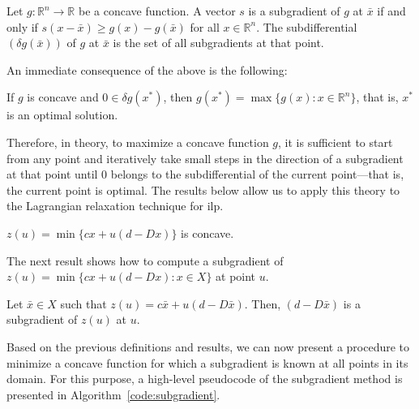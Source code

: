 \begin{definition}\label{definition:subgradient}
	Let $g : \mathbb{R}^n \rightarrow \mathbb{R}$ be a concave function. A vector $s$ is a subgradient of $g$ at $\bar{x}$ if and only if $s(x - \bar{x}) \geq g(x) - g(\bar{x})$ for all $x \in \mathbb{R}^n$. The subdifferential $(\delta g(\bar{x}))$ of $g$ at $\bar{x}$ is the set of all subgradients at that point.
\end{definition}

An immediate consequence of the above is the following:

\begin{proposition}\label{proposition:optimal}
	If $g$ is concave and $0 \in \delta g(x^*)$, then $g(x^*) = \max\{g(x) : x \in \mathbb{R}^n\}$, that is, $x^*$ is an optimal solution.
\end{proposition}

Therefore, in theory, to maximize a concave function $g$, it is sufficient to
start from any point and iteratively take small steps in the direction of a
subgradient at that point until $0$ belongs to the subdifferential of the
current point—that is, the current point is optimal. The results below allow us
to apply this theory to the Lagrangian relaxation technique for \gls{ilp}.

\begin{proposition} \label{proposition-zu-convex}
	$z(u) = \min \{cx + u (d - Dx)\}$ is concave.
\end{proposition}

The next result shows how to compute a subgradient of $z(u) = \min \{cx + u (d -
	Dx) : x \in X\}$ at point $u$.

\begin{proposition}
	Let $\bar{x} \in X$ such that $z(u) = c \bar{x} + u(d - D\bar{x})$. Then, $(d - D\bar{x})$ is a subgradient of $z(u)$ at $u$.
\end{proposition}

Based on the previous definitions and results, we can now present a procedure to
minimize a concave function for which a subgradient is known at all points in
its domain. For this purpose, a high-level pseudocode of the subgradient method
is presented in Algorithm~\ref{code:subgradient}.

